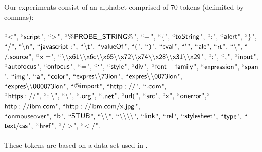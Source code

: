 Our experiments consist of an alphabet comprised of 70 tokens (delimited by commas):\\\\ ``$\sf{<}$", ``$\sf{script}$", ``$\sf{>}$", ``$\sf{\%PROBE\_STRING\%}$", ``$\sf{+}$", ``$\sf{\{}$", ``$\sf{toString}$", ``$\sf{:}$", ``$\sf{alert}$", ``$\sf{\}}$", ``$\sf{/}$", ``$\sf{\backslash n}$", ``$\sf{javascript:}$", ``$\sf{\backslash t}$", ``$\sf{valueOf}$", ``$\sf{(}$", ``$\sf{)}$", ``$\sf{eval}$", ``$\sf{'}$", ``$\sf{ale}$", ``$\sf{rt}$", ``$\sf{\backslash }$", ``$\sf{/.source}$", ``$\sf{x=}$", ``$\sf{\backslash \backslash x61\backslash \backslash x6c\backslash \backslash x65\backslash \backslash x72\backslash \backslash x74\backslash \backslash x28\backslash \backslash x31\backslash \backslash x29}$", ``$\sf{;}$", ``$\sf{,}$", ``$\sf{input}$", ``$\sf{autofocus}$", ``$\sf{onfocus}$", ``$\sf{=}$", ``$\sf{`}$", ``$\sf{style}$", ``$\sf{div}$", ``$\sf{font-family}$", ``$\sf{expression}$", ``$\sf{span}$", ``$\sf{img}$", ``$\sf{a}$", ``$\sf{color}$", ``$\sf{expres\backslash \backslash 73ion}$", ``$\sf{expres\backslash \backslash 0073ion}$",\\``$\sf{expres\backslash \backslash 000073ion}$", ``$\sf{@import}$", ``$\sf{http://}$", ``$\sf{.com}$",\\ ``$\sf{https://}$", ``$\sf{:\backslash }$", ``$\sf{\backslash }$", ``$\sf{.org}$", ``$\sf{.net}$", ``$\sf{url(}$", ``$\sf{src}$", ``$\sf{x}$", ``$\sf{onerror}$",``$\sf{http://ibm.com}$", ``$\sf{http://ibm.com/x.jpg}$",\\``$\sf{onmouseover}$", ``$\sf{b}$", ``$\sf{STUB}$", ``$\sf{\backslash \backslash }$", ``$\sf{\backslash \backslash \backslash \backslash }$", ``$\sf{link}$", ``$\sf{rel}$", ``$\sf{stylesheet}$", ``$\sf{type}$", ``$\sf{text/css}$", ``$\sf{href}$", ``$\sf{/>}$", ``$\sf{</}$".\\\\ 
These tokens are based on a data set used in \cite{TrippIssta:2013}.

